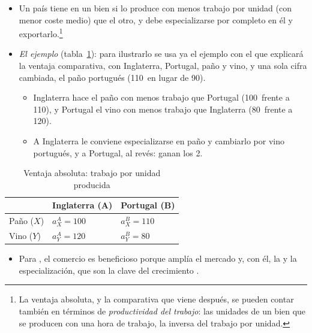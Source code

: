 \documentclass[11pt]{article}
\begin{document}
\begin{itemize}
\item Un país tiene  en un bien si lo produce con menos trabajo por unidad (con menor coste medio) que el otro, y debe especializarse por completo en él y exportarlo.\footnote{La ventaja absoluta, y la comparativa que viene después, se pueden contar también en términos de \emph{productividad del trabajo}: las unidades de un bien que se producen con una hora de trabajo, la inversa del trabajo por unidad.}
\item \emph{El ejemplo} (tabla~\ref{tab:ventaja-absoluta}): para ilustrarlo se usa ya el ejemplo con el que  explicará la ventaja comparativa, con Inglaterra, Portugal, paño y vino, y una sola cifra cambiada, el paño portugués (110~en lugar de 90).
  \begin{itemize}
  \item Inglaterra hace el paño con menos trabajo que Portugal (100~frente a 110), y Portugal el vino con menos trabajo que Inglaterra (80~frente a 120).
  \item A Inglaterra le conviene especializarse en paño y cambiarlo por vino portugués, y a Portugal, al revés: ganan los 2.
  \end{itemize}
\end{itemize}
\begin{table}[H]
\centering
\caption{Ventaja absoluta: trabajo por unidad producida}\label{tab:ventaja-absoluta}
\begin{tabular}{>{\raggedright\arraybackslash}m{4.4cm}>{\centering\arraybackslash}m{3.2cm}>{\centering\arraybackslash}m{3.2cm}}
\toprule
\rowcolor{tceeazulpalido} & \textbf{Inglaterra (A)} & \textbf{Portugal (B)}\\
\midrule
Paño ($X$) & \textcolor{tceeazul}{$a_X^A=100$} & $a_X^B=110$\\
\addlinespace[0.3em]
Vino ($Y$) & $a_Y^A=120$ & \textcolor{tceeazul}{$a_Y^B=80$}\\
\bottomrule
\end{tabular}
\end{table}
\begin{itemize}
\item Para , el comercio es beneficioso porque amplía el mercado y, con él, la  y la especialización, que son la clave del crecimiento .
\end{itemize}
\end{document}
